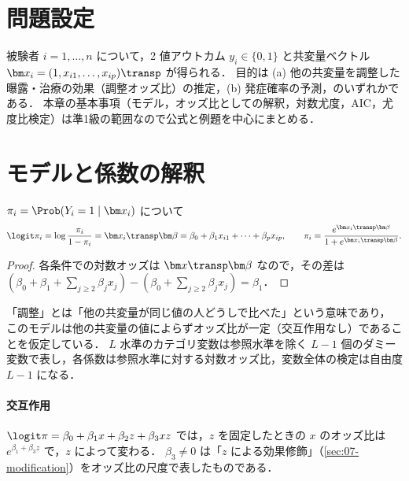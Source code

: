 \section{問題設定}\label{sec:06-setting}
被験者 $i=1,\dots,n$ について，2 値アウトカム $y_i\in\{0,1\}$ と共変量ベクトル $\bm x_i=(1,x_{i1},\dots,x_{ip})\transp$ が得られる．
目的は (a) 他の共変量を調整した曝露・治療の効果（調整オッズ比）の推定，(b) 発症確率の予測，のいずれかである．
本章の基本事項（モデル，オッズ比としての解釈，対数尤度，AIC，尤度比検定）は準1級の範囲なので公式と例題を中心にまとめる．

\section{モデルと係数の解釈}\label{sec:06-model}
\begin{teigi}[ロジスティック回帰モデル]\label{def:06-logit}
$\pi_i=\Prob(Y_i=1\mid\bm x_i)$ について
\begin{equation}
\logit\pi_i=\log\frac{\pi_i}{1-\pi_i}=\bm x_i\transp\bm\beta=\beta_0+\beta_1x_{i1}+\dots+\beta_px_{ip},\qquad
\pi_i=\frac{e^{\bm x_i\transp\bm\beta}}{1+e^{\bm x_i\transp\bm\beta}}.\label{eq:06-logit}
\end{equation}
\end{teigi}
\begin{proof}
各条件での対数オッズは $\bm x\transp\bm\beta$ なので，その差は $(\beta_0+\beta_1+\sum_{j\ge2}\beta_jx_j)-(\beta_0+\sum_{j\ge2}\beta_jx_j)=\beta_1$．
\end{proof}
「調整」とは「他の共変量が同じ値の人どうしで比べた」という意味であり，
このモデルは他の共変量の値によらずオッズ比が一定（交互作用なし）であることを仮定している．
$L$ 水準のカテゴリ変数は参照水準を除く $L-1$ 個のダミー変数で表し，各係数は参照水準に対する対数オッズ比，変数全体の検定は自由度 $L-1$ になる．

\paragraph{交互作用}
$\logit\pi=\beta_0+\beta_1x+\beta_2z+\beta_3xz$ では，$z$ を固定したときの $x$ のオッズ比は $e^{\beta_1+\beta_3z}$ で，$z$ によって変わる．
$\beta_3\ne0$ は「$z$ による効果修飾」（\cref{sec:07-modification}）をオッズ比の尺度で表したものである．

